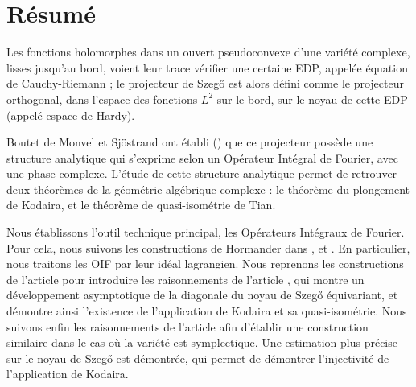 

\begingroup
\let\clearpage\relax
\let\cleardoublepage\relax
\let\cleardoublepage\relax

\chapter*{Résumé}
	Les fonctions holomorphes dans un ouvert pseudoconvexe d'une variété complexe, lisses jusqu'au bord, voient leur trace vérifier une certaine EDP, appelée équation de Cauchy-Riemann ; le projecteur de Szeg\H{o} est alors  défini comme le projecteur orthogonal, dans l'espace des fonctions $L^2$ sur
	le bord, sur le noyau de cette EDP (appelé espace de Hardy).
	
	Boutet de Monvel et Sjöstrand ont établi (\cite{BoutetdeMonvel1975}) que ce projecteur possède une structure analytique qui s'exprime selon un Opérateur Intégral de Fourier, avec une phase complexe. L'étude de cette structure analytique permet de retrouver deux théorèmes de la géométrie algébrique complexe : le théorème du plongement de Kodaira, et le théorème de quasi-isométrie de Tian.
	
	Nous établissons l'outil technique principal, les Opérateurs Intégraux de Fourier. Pour cela, nous suivons les constructions de Hormander dans \cite{hormander2003analysis}, \cite{hormander2007} et \cite{hormander1985}. En particulier, nous traitons les OIF par leur idéal lagrangien. Nous reprenons les constructions de l'article \cite{BoutetdeMonvel1975} pour introduire les raisonnements de l'article \cite{Zelditch2000}, qui montre un développement asymptotique de la diagonale du noyau de Szeg\H{o} équivariant, et démontre ainsi l'existence de l'application de Kodaira et sa quasi-isométrie. Nous suivons enfin les raisonnements de l'article \cite{Shiffman2002} afin d'établir une construction similaire dans le cas où la variété est symplectique. Une estimation plus précise sur le noyau de Szeg\H{o} est démontrée, qui permet de démontrer l'injectivité de l'application de Kodaira.
\endgroup			

\vfill
